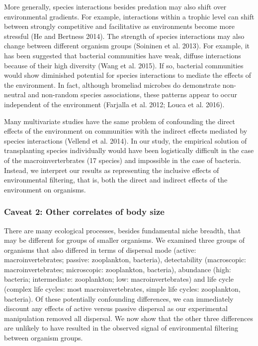 \documentclass[12pt,]{article}
\begin{document}
More generally, species interactions besides predation may also shift
over environmental gradients. For example, interactions within a trophic
level can shift between strongly competitive and facilitative as
environments become more stressful (He and Bertness 2014). The strength
of species interactions may also change between different organism
groups (Soininen et al. 2013). For example, it has been suggested that
bacterial communities have weak, diffuse interactions because of their
high diversity (Wang et al. 2015). If so, bacterial communities would
show diminished potential for species interactions to mediate the
effects of the environment. In fact, although bromeliad microbes do
demonstrate non-neutral and non-random species associations, these
patterns appear to occur independent of the environment (Farjalla et al.
2012; Louca et al. 2016).

Many multivariate studies have the same problem of confounding the
direct effects of the environment on communities with the indirect
effects mediated by species interactions (Vellend et al. 2014). In our
study, the empirical solution of transplanting species individually
would have been logistically difficult in the case of the
macroinverterbrates (17 species) and impossible in the case of bacteria.
Instead, we interpret our results as representing the inclusive effects
of environmental filtering, that is, both the direct and indirect
effects of the environment on organisms.

\subsubsection{Caveat 2: Other correlates of body
size}\label{caveat-2-other-correlates-of-body-size}

There are many ecological processes, besides fundamental niche breadth,
that may be different for groups of smaller organisms. We examined three
groups of organisms that also differed in terms of dispersal mode
(active: macroinvertebrates; passive: zooplankton, bacteria),
detectability (macroscopic: macroinvertebrates; microscopic:
zooplankton, bacteria), abundance (high: bacteria; intermediate:
zooplankton; low: macroinvertebrates) and life cycle (complex life
cycles: most macroinvertebrates, simple life cycles: zooplankton,
bacteria). Of these potentially confounding differences, we can
immediately discount any effects of active versus passive dispersal as
our experimental manipulation removed all dispersal. We now show that
the other three differences are unlikely to have resulted in the
observed signal of environmental filtering between organism groups.
\end{document}
